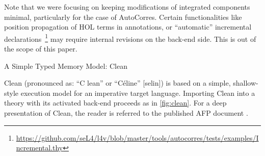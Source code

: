 \begin{isabellebody}
\begin{isamarkuptext}
Note that we were focusing on keeping modifications of integrated components minimal, particularly
for the case of AutoCorres. Certain functionalities like position propagation of HOL terms in
annotations, or ``automatic'' incremental declarations~\footnote{\url{https://github.com/seL4/l4v/blob/master/tools/autocorres/tests/examples/Incremental.thy}}
may require internal revisions on the back-end side. This is out of the scope of this paper.%
\end{isamarkuptext}\isamarkuptrue%
%
\begin{isamarkupsubsection*}%
[label = {clean},type = {scholarly_paper.technical}, args={label = {clean},type = {scholarly_paper.technical}, scholarly_paper.text_section.main_author = {@{docitem ''bu''}}, Isa_COL.text_element.level = {}, Isa_COL.text_element.referentiable = {False}, Isa_COL.text_element.variants = {{STR ''outline'', STR ''document''}}, scholarly_paper.text_section.fixme_list = {}, Isa_COL.text_element.level = {}, scholarly_paper.technical.definition_list = {}}]A Simple Typed Memory Model: Clean%
\end{isamarkupsubsection*}\isamarkuptrue%
%
\begin{isamarkuptext}%
Clean (pronounced as: ``C lean'' or ``Céline'' [selin]) is based on a simple,
shallow-style execution model for an imperative target language.
Importing Clean into a theory with its activated back-end proceeds as in \autoref{fig:clean}.
For a deep presentation of Clean, the reader is referred to the published AFP document \cite{journals/afp/TuongW19}.


\end{isamarkuptext}
\end{isabellebody}
